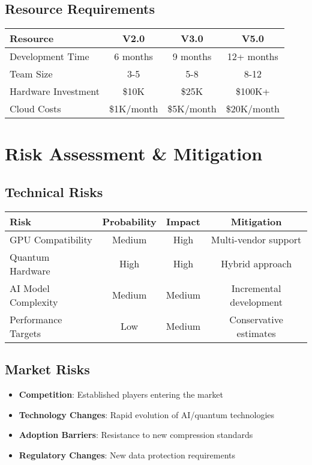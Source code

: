 \documentclass[12pt,a4paper]{article}
\begin{document}
\subsection{Resource Requirements}
\begin{center}
\begin{tabular}{|l|c|c|c|}
\hline
\textbf{Resource} & \textbf{V2.0} & \textbf{V3.0} & \textbf{V5.0} \\
\hline
Development Time & 6 months & 9 months & 12+ months \\
Team Size & 3-5 & 5-8 & 8-12 \\
Hardware Investment & \$10K & \$25K & \$100K+ \\
Cloud Costs & \$1K/month & \$5K/month & \$20K/month \\
\hline
\end{tabular}
\end{center}

\newpage

\section{Risk Assessment \& Mitigation}

\subsection{Technical Risks}
\begin{center}
\begin{tabular}{|l|c|c|c|}
\hline
\textbf{Risk} & \textbf{Probability} & \textbf{Impact} & \textbf{Mitigation} \\
\hline
GPU Compatibility & Medium & High & Multi-vendor support \\
Quantum Hardware & High & High & Hybrid approach \\
AI Model Complexity & Medium & Medium & Incremental development \\
Performance Targets & Low & Medium & Conservative estimates \\
\hline
\end{tabular}
\end{center}

\subsection{Market Risks}
\begin{itemize}
    \item \textbf{Competition}: Established players entering the market
    \item \textbf{Technology Changes}: Rapid evolution of AI/quantum technologies
    \item \textbf{Adoption Barriers}: Resistance to new compression standards
    \item \textbf{Regulatory Changes}: New data protection requirements
\end{itemize}
\end{document}
